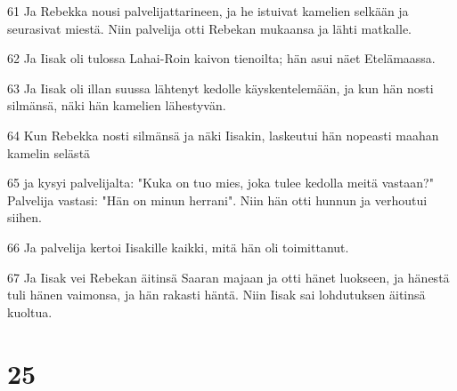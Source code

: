 \par 61 Ja Rebekka nousi palvelijattarineen, ja he istuivat kamelien selkään ja seurasivat miestä. Niin palvelija otti Rebekan mukaansa ja lähti matkalle.
\par 62 Ja Iisak oli tulossa Lahai-Roin kaivon tienoilta; hän asui näet Etelämaassa.
\par 63 Ja Iisak oli illan suussa lähtenyt kedolle käyskentelemään, ja kun hän nosti silmänsä, näki hän kamelien lähestyvän.
\par 64 Kun Rebekka nosti silmänsä ja näki Iisakin, laskeutui hän nopeasti maahan kamelin selästä
\par 65 ja kysyi palvelijalta: "Kuka on tuo mies, joka tulee kedolla meitä vastaan?" Palvelija vastasi: "Hän on minun herrani". Niin hän otti hunnun ja verhoutui siihen.
\par 66 Ja palvelija kertoi Iisakille kaikki, mitä hän oli toimittanut.
\par 67 Ja Iisak vei Rebekan äitinsä Saaran majaan ja otti hänet luokseen, ja hänestä tuli hänen vaimonsa, ja hän rakasti häntä. Niin Iisak sai lohdutuksen äitinsä kuoltua.

\chapter{25}

